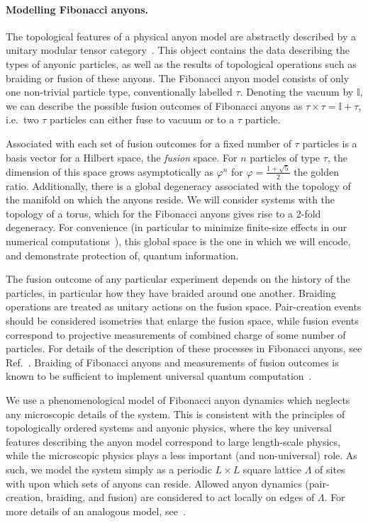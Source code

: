 \documentclass[aps, prl, letterpaper, twocolumn, superscriptaddress, notitlepage, 10pt]{revtex4-1}
\begin{document}
\paragraph{Modelling Fibonacci anyons.}

The topological features of a physical anyon model are abstractly described by a unitary modular tensor category~\cite{Wang2010b}. This object contains the data describing the types of anyonic particles, as well as the results of topological operations such as braiding or fusion of these anyons. The Fibonacci anyon model consists of only one non-trivial particle type, conventionally labelled $\tau$. Denoting the vacuum by $\mathbb{I}$, we can describe the possible fusion outcomes of Fibonacci anyons as $\tau\times\tau=\mathbb{I}+\tau$, i.e.~two $\tau$ particles can either fuse to vacuum or to a $\tau$ particle.

Associated with each set of fusion outcomes for a fixed number of $\tau$ particles is a basis vector for a Hilbert space, the \emph{fusion} space. For $n$ particles of type $\tau$, the dimension of this space grows asymptotically as $\varphi^n$ for $\varphi=\frac{1+\sqrt{5}}{2}$ the golden ratio. Additionally, there is a global degeneracy associated with the topology of the manifold on which the anyons reside. We will consider systems with the topology of a torus, which for the Fibonacci anyons gives rise to a 2-fold degeneracy. For convenience (in particular to minimize finite-size effects in our numerical computations~\cite{Brell2013}), this global space is the one in which we will encode, and demonstrate protection of, quantum information.
	
The fusion outcome of any particular experiment depends on the history of the particles, in particular how they have braided around one another. Braiding operations are treated as unitary actions on the fusion space. Pair-creation events should be considered isometries that enlarge the fusion space, while fusion events correspond to projective 
measurements of combined charge of some number of particles. For details of the description of these processes in Fibonacci anyons, see Ref.~\cite{Trebst2008}.  Braiding of Fibonacci anyons and measurements of fusion outcomes is known to be sufficient to implement universal quantum computation~\cite{?}.

We use a phenomenological model of Fibonacci anyon dynamics which neglects any microscopic details of the system. This is consistent with the principles of topologically ordered systems and anyonic physics, where the key universal features describing the anyon model correspond to large length-scale physics, while the microscopic physics plays a less 
important (and non-universal) role. As such, we model the system simply as a periodic $L\times L$ square lattice $\Lambda$ of sites with upon which sets of anyons can reside. Allowed anyon dynamics (pair-creation, braiding, and fusion) are considered to act locally on edges of $\Lambda$. For more details of an analogous model, see~\cite{Brell2013}.
	
\end{document}
